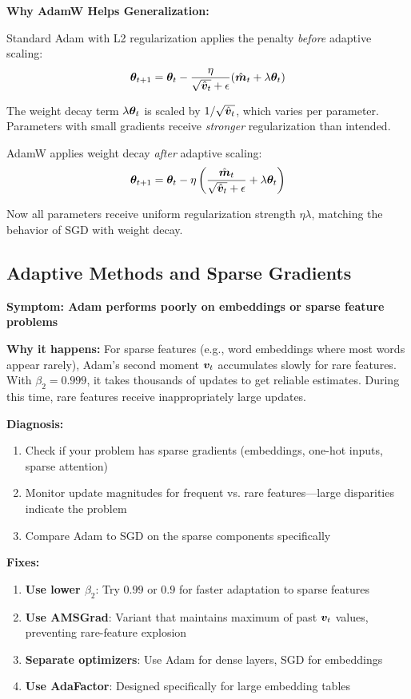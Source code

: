 \documentclass[../../main.tex]{subfiles}
\begin{document}
\begin{keyconcept}
\textbf{Why AdamW Helps Generalization:}

Standard Adam with L2 regularization applies the penalty \textit{before} adaptive scaling:
\[
    \boldsymbol{\theta}_{t+1} = \boldsymbol{\theta}_t - \frac{\eta}{\sqrt{\hat{\boldsymbol{v}}_t} + \epsilon} (\hat{\boldsymbol{m}}_t + \lambda \boldsymbol{\theta}_t)
\]

The weight decay term $\lambda \boldsymbol{\theta}_t$ is scaled by $1/\sqrt{\hat{\boldsymbol{v}}_t}$, which varies per parameter. Parameters with small gradients receive \textit{stronger} regularization than intended.

AdamW applies weight decay \textit{after} adaptive scaling:
\[
    \boldsymbol{\theta}_{t+1} = \boldsymbol{\theta}_t - \eta \left( \frac{\hat{\boldsymbol{m}}_t}{\sqrt{\hat{\boldsymbol{v}}_t} + \epsilon} + \lambda \boldsymbol{\theta}_t \right)
\]

Now all parameters receive uniform regularization strength $\eta \lambda$, matching the behavior of SGD with weight decay.
\end{keyconcept}

\subsection{Adaptive Methods and Sparse Gradients}

\begin{important}
\textbf{Symptom: Adam performs poorly on embeddings or sparse feature problems}

\textbf{Why it happens:} For sparse features (e.g., word embeddings where most words appear rarely), Adam's second moment $\boldsymbol{v}_t$ accumulates slowly for rare features. With $\beta_2 = 0.999$, it takes thousands of updates to get reliable estimates. During this time, rare features receive inappropriately large updates.

\textbf{Diagnosis:}
\begin{enumerate}
    \item Check if your problem has sparse gradients (embeddings, one-hot inputs, sparse attention)
    \item Monitor update magnitudes for frequent vs. rare features---large disparities indicate the problem
    \item Compare Adam to SGD on the sparse components specifically
\end{enumerate}

\textbf{Fixes:}
\begin{enumerate}
    \item \textbf{Use lower $\beta_2$}: Try $0.99$ or $0.9$ for faster adaptation to sparse features
    \item \textbf{Use AMSGrad}: Variant that maintains maximum of past $\boldsymbol{v}_t$ values, preventing rare-feature explosion
    \item \textbf{Separate optimizers}: Use Adam for dense layers, SGD for embeddings
    \item \textbf{Use AdaFactor}: Designed specifically for large embedding tables
\end{enumerate}
\end{important}
\end{document}
